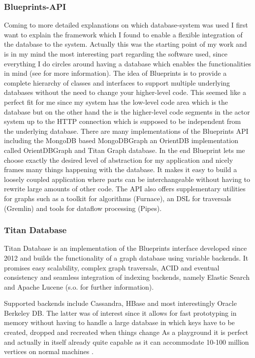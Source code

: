 \documentclass[twoside, 11pt]{scrartcl}
\begin{document}
\subsubsection{Blueprints-API}
Coming to more detailed explanations on which database-system was used I first want to explain the framework which I found to enable a flexible integration of the database to the system.
Actually this was the starting point of my work and is in my mind the most interesting part regarding the software used, since everything I do circles around having a database which enables the functionalities in mind (see \cite{link:blueprints} for more information).
The idea of Blueprints is to provide a complete hierarchy of classes and interfaces to support multiple underlying databases without the need to change your higher-level code. This seemed like a perfect fit for me since my system has the low-level code area which is the database but on the other hand the is the higher-level code segments in the actor system up to the HTTP connection which is supposed to be independent from the underlying database.
There are many implementations of the Blueprints API including the MongoDB based MongoDBGraph an OrientDB implementation called OrientDBGraph and Titan Graph database.
In the end Blueprint lets me choose exactly the desired level of abstraction for my application and nicely frames many things happening with the database. It makes it easy to build a loosely coupled application where parts can be interchangeable without having to rewrite large amounts of other code.
The API also offers supplementary utilities for graphs such as a toolkit for algorithms (Furnace), an DSL for traversals (Gremlin) and tools for dataflow processing (Pipes).


\subsubsection{Titan Database}
Titan Database is an implementation of the Blueprints interface developed since 2012 and builds the functionality of a graph database using variable backends. It promises easy scalability, complex graph traversals, ACID and eventual consistency and seamless integration of indexing backends, namely Elastic Search and Apache Lucene (s.o. \cite{link:titanHome} for further information).

Supported backends include Cassandra, HBase and most interestingly Oracle Berkeley DB. The latter was of interest since it allows for fast prototyping in memory without having to handle a large database in which keys have to be created, dropped and recreated when things change \cite{link:berkeleyDB} As a playground it is perfect and actually in itself already quite capable as it can accommodate 10-100 million vertices on normal machines \cite{link:titanWithBerkeley}.
\end{document}
